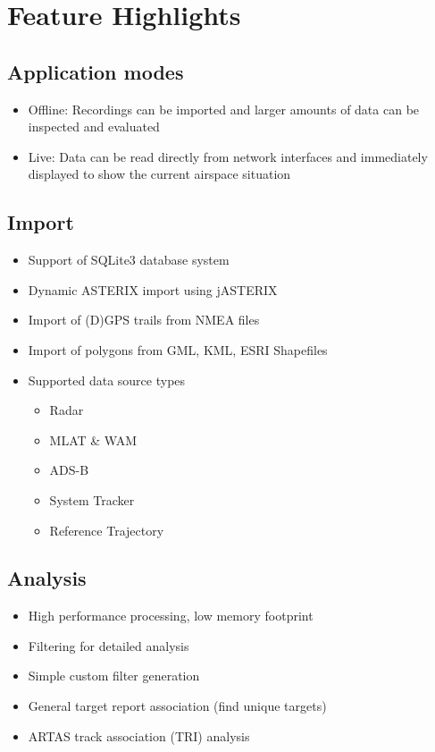 \section{Feature Highlights}

\subsection{Application modes}
\begin{itemize} 
    \item Offline: Recordings can be imported and larger amounts of data can be inspected and evaluated
    \item Live: Data can be read directly from network interfaces and immediately displayed to show the current airspace situation
\end{itemize}

\subsection{Import}
\begin{itemize}  
    \item Support of SQLite3 database system
    \item Dynamic ASTERIX import using jASTERIX
    \item Import of (D)GPS trails from NMEA files
    \item Import of polygons from GML, KML, ESRI Shapefiles
    \item Supported data source types
    \begin{itemize}  
        \item Radar
        \item MLAT \& WAM
        \item ADS-B
        \item System Tracker
        \item Reference Trajectory
    \end{itemize}
\end{itemize}

\subsection{Analysis}
\begin{itemize}  
    \item High performance processing, low memory footprint
    \item Filtering for detailed analysis
    \item Simple custom filter generation
    \item General target report association (find unique targets)
    \item ARTAS track association (TRI) analysis
\end{itemize}

